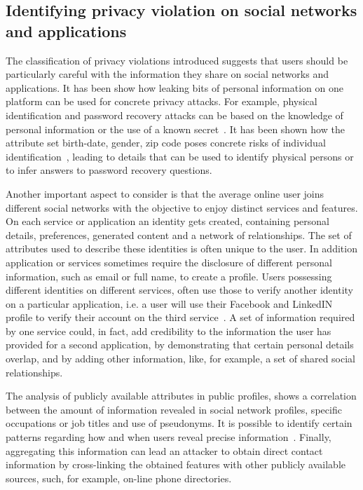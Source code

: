 \subsection{Identifying privacy violation on social networks and applications}

The classification of privacy violations introduced suggests that users should be particularly careful with the information they share on social networks and applications. It has been show how leaking bits of personal information on one platform can be used for concrete privacy attacks. For example, physical identification and password recovery attacks can be based on the knowledge of personal information or the use of a known secret~\cite{irani-et-al}. It has been shown how the attribute set {birth-date, gender, zip code} poses concrete risks of individual identification~\cite{sweeney}, leading to details that can be used to identify physical persons or to infer answers to password­ recovery questions.

Another important aspect to consider is that the average online user joins different social networks with the objective to enjoy distinct services and features. On each service or application an identity gets created, containing personal details, preferences, generated content and a network of relationships. The set of attributes used to describe these identities is often unique to the user. In addition application or services sometimes require the disclosure of different personal information, such as email or full name, to create a profile. Users possessing different identities on different services, often use those to verify another identity on a particular application, i.e. a user will use their Facebook and LinkedIN profile to verify their account on the third service~\cite{paridhi-et-al}. A set of information required by one service could, in fact, add credibility to the information the user has provided for a second application, by demonstrating that certain personal details overlap, and by adding other information, like, for example, a set of shared social relationships.

The analysis of publicly available attributes in public profiles, shows a correlation between the amount of information revealed in social network profiles, specific occupations or job titles and use of pseudonyms. It is possible to identify certain patterns regarding how and when users reveal precise information~\cite{chen-et-al}. Finally, aggregating this information can lead an attacker to obtain direct contact information by cross-linking the obtained features with other publicly available sources, such, for example, on-line phone directories.

